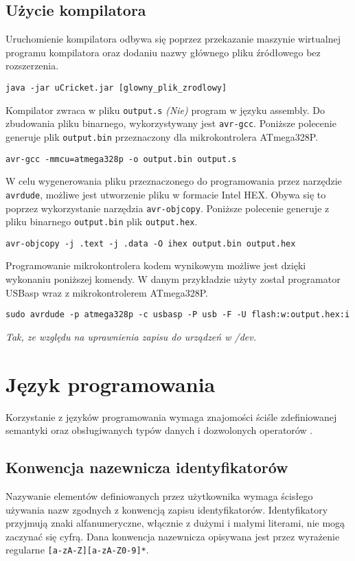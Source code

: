 \subsection{Użycie kompilatora}
Uruchomienie kompilatora odbywa się poprzez przekazanie maszynie wirtualnej programu kompilatora oraz dodaniu nazwy głównego pliku źródłowego bez rozszerzenia.
\begin{lstlisting}
java -jar uCricket.jar [glowny_plik_zrodlowy]
\end{lstlisting}
Kompilator zwraca w pliku \lstinline|output.s|  \textit{(Nie)} program w języku assembly. Do zbudowania pliku binarnego, wykorzystywany jest \lstinline|avr-gcc|. Poniższe polecenie generuje plik \lstinline|output.bin| przeznaczony dla mikrokontrolera ATmega328P.
\begin{lstlisting}
avr-gcc -mmcu=atmega328p -o output.bin output.s
\end{lstlisting}
W celu wygenerowania pliku przeznaczonego do programowania przez narzędzie \lstinline|avrdude|, możliwe jest utworzenie pliku w formacie Intel HEX. Obywa się to poprzez wykorzystanie narzędzia \lstinline|avr-objcopy|. Poniższe polecenie generuje z pliku binarnego \lstinline|output.bin| plik \lstinline|output.hex|.
\begin{lstlisting}
avr-objcopy -j .text -j .data -O ihex output.bin output.hex
\end{lstlisting}
Programowanie mikrokontrolera kodem wynikowym możliwe jest dzięki wykonaniu poniższej komendy. W danym przykładzie użyty został programator USBasp wraz z mikrokontrolerem ATmega328P.
\begin{lstlisting}
sudo avrdude -p atmega328p -c usbasp -P usb -F -U flash:w:output.hex:i
\end{lstlisting}
\textit{Tak, ze względu na uprawnienia zapisu do urządzeń w /dev.} 

\section{Język programowania}
Korzystanie z języków programowania wymaga znajomości ściśle zdefiniowanej semantyki oraz obsługiwanych typów danych i dozwolonych operatorów . 
\subsection{Konwencja nazewnicza identyfikatorów}
Nazywanie elementów definiowanych przez użytkownika wymaga ścisłego używania nazw zgodnych z konwencją zapisu identyfikatorów. Identyfikatory przyjmują znaki alfanumeryczne, włącznie z dużymi i małymi literami, nie mogą zaczynać się cyfrą. Dana konwencja nazewnicza opisywana jest przez wyrażenie regularne \lstinline|[a-zA-Z][a-zA-Z0-9]*|.

